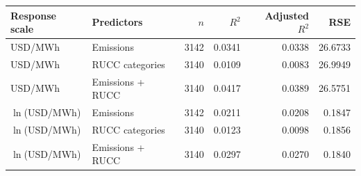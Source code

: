 \begin{tabular}{llrrrr}
\toprule
Response scale & Predictors & $n$ & $R^2$ & Adjusted $R^2$ & RSE \\
\midrule
USD/MWh & Emissions & 3142 & 0.0341 & 0.0338 & 26.6733 \\
USD/MWh & RUCC categories & 3140 & 0.0109 & 0.0083 & 26.9949 \\
USD/MWh & Emissions + RUCC & 3140 & 0.0417 & 0.0389 & 26.5751 \\
$\ln$(USD/MWh) & Emissions & 3142 & 0.0211 & 0.0208 & 0.1847 \\
$\ln$(USD/MWh) & RUCC categories & 3140 & 0.0123 & 0.0098 & 0.1856 \\
$\ln$(USD/MWh) & Emissions + RUCC & 3140 & 0.0297 & 0.0270 & 0.1840 \\
\bottomrule
\end{tabular}
